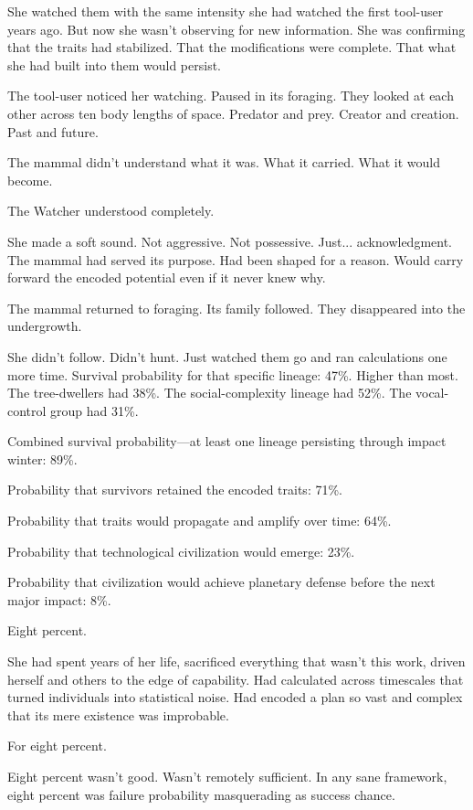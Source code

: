 She watched them with the same intensity she had watched the first tool-user years ago. But now she wasn't observing for new information. She was confirming that the traits had stabilized. That the modifications were complete. That what she had built into them would persist.

The tool-user noticed her watching. Paused in its foraging. They looked at each other across ten body lengths of space. Predator and prey. Creator and creation. Past and future.

The mammal didn't understand what it was. What it carried. What it would become.

The Watcher understood completely.

She made a soft sound. Not aggressive. Not possessive. Just... acknowledgment. The mammal had served its purpose. Had been shaped for a reason. Would carry forward the encoded potential even if it never knew why.

The mammal returned to foraging. Its family followed. They disappeared into the undergrowth.

She didn't follow. Didn't hunt. Just watched them go and ran calculations one more time. Survival probability for that specific lineage: 47\%. Higher than most. The tree-dwellers had 38\%. The social-complexity lineage had 52\%. The vocal-control group had 31\%.

Combined survival probability—at least one lineage persisting through impact winter: 89\%.

Probability that survivors retained the encoded traits: 71\%.

Probability that traits would propagate and amplify over time: 64\%.

Probability that technological civilization would emerge: 23\%.

Probability that civilization would achieve planetary defense before the next major impact: 8\%.

Eight percent.

She had spent years of her life, sacrificed everything that wasn't this work, driven herself and others to the edge of capability. Had calculated across timescales that turned individuals into statistical noise. Had encoded a plan so vast and complex that its mere existence was improbable.

For eight percent.

Eight percent wasn't good. Wasn't remotely sufficient. In any sane framework, eight percent was failure probability masquerading as success chance.

